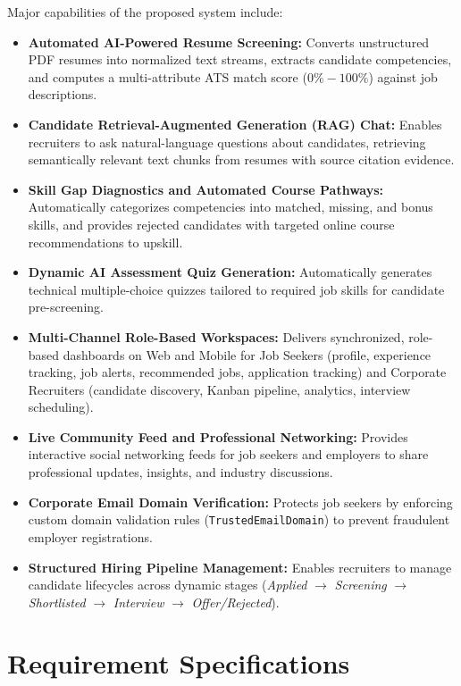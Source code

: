 Major capabilities of the proposed system include:
\begin{itemize}
    \item \textbf{Automated AI-Powered Resume Screening:} Converts unstructured PDF resumes into normalized text streams, extracts candidate competencies, and computes a multi-attribute ATS match score ($0\% - 100\%$) against job descriptions.
    \item \textbf{Candidate Retrieval-Augmented Generation (RAG) Chat:} Enables recruiters to ask natural-language questions about candidates, retrieving semantically relevant text chunks from resumes with source citation evidence.
    \item \textbf{Skill Gap Diagnostics and Automated Course Pathways:} Automatically categorizes competencies into matched, missing, and bonus skills, and provides rejected candidates with targeted online course recommendations to upskill.
    \item \textbf{Dynamic AI Assessment Quiz Generation:} Automatically generates technical multiple-choice quizzes tailored to required job skills for candidate pre-screening.
    \item \textbf{Multi-Channel Role-Based Workspaces:} Delivers synchronized, role-based dashboards on Web and Mobile for Job Seekers (profile, experience tracking, job alerts, recommended jobs, application tracking) and Corporate Recruiters (candidate discovery, Kanban pipeline, analytics, interview scheduling).
    \item \textbf{Live Community Feed and Professional Networking:} Provides interactive social networking feeds for job seekers and employers to share professional updates, insights, and industry discussions.
    \item \textbf{Corporate Email Domain Verification:} Protects job seekers by enforcing custom domain validation rules (\texttt{TrustedEmailDomain}) to prevent fraudulent employer registrations.
    \item \textbf{Structured Hiring Pipeline Management:} Enables recruiters to manage candidate lifecycles across dynamic stages (\textit{Applied} $\rightarrow$ \textit{Screening} $\rightarrow$ \textit{Shortlisted} $\rightarrow$ \textit{Interview} $\rightarrow$ \textit{Offer/Rejected}).
\end{itemize}

\section{Requirement Specifications}

